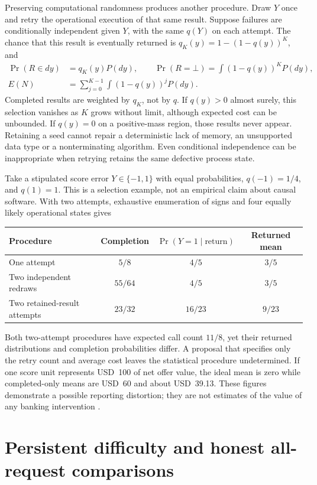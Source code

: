 Preserving computational randomness produces another procedure. Draw $Y$ once
and retry the operational execution of that same result. Suppose failures are
conditionally independent given $Y$, with the same $q(Y)$ on each attempt.
The chance that this result is eventually returned is
$q_K(y)=1-(1-q(y))^K$, and
\begin{align}
 \Pr(R\in dy)&=q_K(y)P(dy),\qquad
 \Pr(R=\bot)=\int(1-q(y))^K P(dy),
 \nonumber\\
 E(N)&=\sum_{j=0}^{K-1}\int(1-q(y))^jP(dy).
 \label{exec17:s9-frozen-law}
\end{align}
Completed results are weighted by $q_K$, not by $q$. If $q(y)>0$ almost
surely, this selection vanishes as $K$ grows without limit, although expected
cost can be unbounded. If $q(y)=0$ on a positive-mass region, those results
never appear. Retaining a seed cannot repair a deterministic lack of memory,
an unsupported data type or a nonterminating algorithm. Even conditional
independence can be inappropriate when retrying retains the same defective
process state.

Take a stipulated score error $Y\in\{-1,1\}$ with equal probabilities,
$q(-1)=1/4$, and $q(1)=1$. This is a selection example, not an empirical
claim about causal software. With two attempts, exhaustive enumeration of
signs and four equally likely operational states gives
\begin{center}
\begin{tabular}{lccc}
\hline
Procedure & Completion & $\Pr(Y=1\mid\text{return})$ & Returned mean\\
\hline
One attempt & $5/8$ & $4/5$ & $3/5$\\
Two independent redraws & $55/64$ & $4/5$ & $3/5$\\
Two retained-result attempts & $23/32$ & $16/23$ & $9/23$\\
\hline
\end{tabular}
\end{center}
Both two-attempt procedures have expected call count $11/8$, yet their
returned distributions and completion probabilities differ. A proposal that
specifies only the retry count and average cost leaves the statistical
procedure undetermined. If one score unit represents USD~100 of net offer
value, the ideal mean is zero while completed-only means are USD~60 and about
USD~39.13. These figures demonstrate a possible reporting distortion; they are
not estimates of the value of any banking intervention
\citep{exec17_s9_composition}.

\section{Persistent difficulty and honest all-request comparisons}
\label{exec17:s9-persistent-failures}

